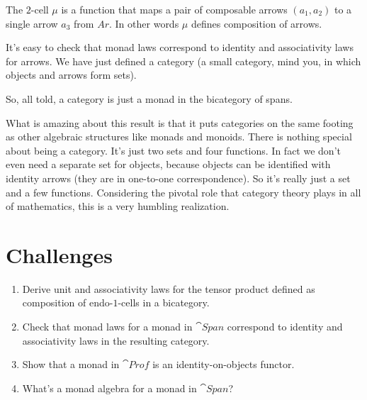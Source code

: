 \begin{figure}[H]
\centering
{}

\end{figure}

\noindent
The $2$-cell $\mu$ is a function that maps a pair of composable
arrows $(a_1, a_2)$ to a single arrow $a_3$ from
$Ar$. In other words $\mu$ defines composition of arrows.

It's easy to check that monad laws correspond to identity and
associativity laws for arrows. We have just defined a category (a small
category, mind you, in which objects and arrows form sets).

So, all told, a category is just a monad in the bicategory of spans.

What is amazing about this result is that it puts categories on the same
footing as other algebraic structures like monads and monoids. There is
nothing special about being a category. It's just two sets and four
functions. In fact we don't even need a separate set for objects,
because objects can be identified with identity arrows (they are in
one-to-one correspondence). So it's really just a set and a few
functions. Considering the pivotal role that category theory plays in
all of mathematics, this is a very humbling realization.

\section{Challenges}

\begin{enumerate}
\tightlist
\item
  Derive unit and associativity laws for the tensor product defined as
  composition of endo-$1$-cells in a bicategory.
\item
  Check that monad laws for a monad in $\cat{Span}$ correspond to
  identity and associativity laws in the resulting category.
\item
  Show that a monad in $\cat{Prof}$ is an identity-on-objects functor.
\item
  What's a monad algebra for a monad in $\cat{Span}$?
\end{enumerate}

